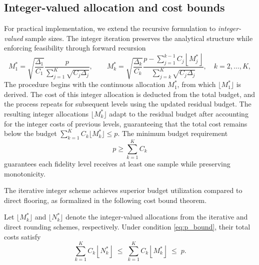 \subsection{Integer-valued allocation and cost bounds}

For practical implementation, we extend the recursive formulation to {\it integer-valued} sample sizes. The integer iteration preserves the analytical structure while enforcing feasibility through forward recursion
%
\begin{equation}\label{eq:MFMC_New_IntegerValued_Sample_Size}
    M_1^* = \sqrt{\frac{\Delta_1}{C_1}}\frac{p}{\sum_{j=1}^K\sqrt{C_j\Delta_j}}, 
    \qquad 
    M_k^* = \sqrt{\frac{\Delta_k}{C_k}}\frac{p-\sum_{j=1}^{k-1}C_j\left\lfloor M_j^* \right\rfloor}{\sum_{j=k}^K\sqrt{C_j\Delta_j}}, 
    \quad k = 2,\ldots, K,
\end{equation}
%
The procedure begins with the continuous allocation $M_1^*$, from which $\lfloor M_1^* \rfloor$ is derived. The cost of this integer allocation is deducted from the total budget, and the process repeats for subsequent levels using the updated residual budget. The resulting integer allocations $\lfloor M_k^*\rfloor$ adapt to the residual budget after accounting for the integer costs of previous levels, guaranteeing that the total cost remains below the budget $\sum_{k=1}^K C_k\lfloor M_k^*\rfloor \le p$. The minimum budget requirement 
%
\begin{equation}\label{eq:p_bound}
    p \ge \sum_{k=1}^K C_k
\end{equation}
%
guarantees each fidelity level receives at least one sample while preserving monotonicity.

The iterative integer scheme achieves superior budget utilization compared to direct flooring, as formalized in the following cost bound theorem.

\begin{theorem}
\label{thm:MFMC_New_IntegerValued_Cost}
Let $\lfloor M_k^* \rfloor$ and $\lfloor N_k^* \rfloor$ denote the integer-valued allocations from the iterative and direct rounding schemes, respectively. Under condition \eqref{eq:p_bound}, their total costs satisfy
\begin{equation}\label{eq:Iterative_integer_sample_size_cost_bound}
    \sum_{k=1}^K C_k \left\lfloor N_k^* \right\rfloor
    \;\le\;
    \sum_{k=1}^K C_k \left\lfloor M_k^* \right\rfloor
    \;\le\;
    p.
\end{equation}
\end{theorem}

